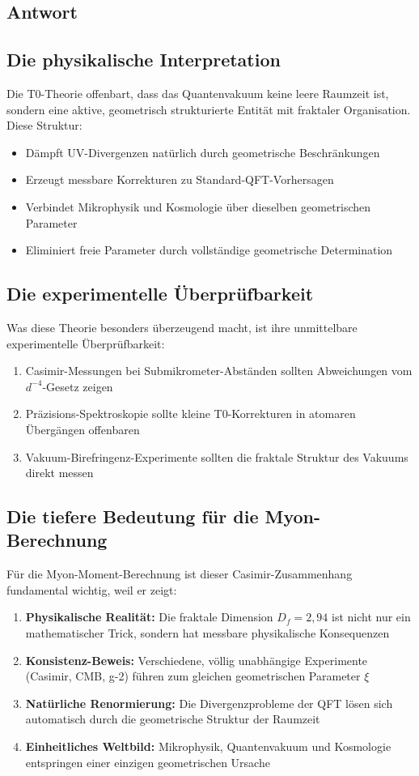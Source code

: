 \documentclass[12pt,a4paper]{article}
\theoremstyle{remark}
\newenvironment{answer}{\subsection*{Antwort}}{\vspace{1em}}
\begin{document}
\begin{answer}
	\subsection{Die physikalische Interpretation}
	
	Die T0-Theorie offenbart, dass das Quantenvakuum keine leere Raumzeit ist, sondern eine aktive, geometrisch strukturierte Entität mit fraktaler Organisation. Diese Struktur:
	\begin{itemize}
		\item Dämpft UV-Divergenzen natürlich durch geometrische Beschränkungen
		\item Erzeugt messbare Korrekturen zu Standard-QFT-Vorhersagen
		\item Verbindet Mikrophysik und Kosmologie über dieselben geometrischen Parameter
		\item Eliminiert freie Parameter durch vollständige geometrische Determination
	\end{itemize}
	
	\subsection{Die experimentelle Überprüfbarkeit}
	
	Was diese Theorie besonders überzeugend macht, ist ihre unmittelbare experimentelle Überprüfbarkeit:
	\begin{enumerate}
		\item Casimir-Messungen bei Submikrometer-Abständen sollten Abweichungen vom $d^{-4}$-Gesetz zeigen
		\item Präzisions-Spektroskopie sollte kleine T0-Korrekturen in atomaren Übergängen offenbaren
		\item Vakuum-Birefringenz-Experimente sollten die fraktale Struktur des Vakuums direkt messen
	\end{enumerate}
	
	\subsection{Die tiefere Bedeutung für die Myon-Berechnung}
	
	Für die Myon-Moment-Berechnung ist dieser Casimir-Zusammenhang fundamental wichtig, weil er zeigt:
	\begin{enumerate}
		\item \textbf{Physikalische Realität:} Die fraktale Dimension $D_f = 2{,}94$ ist nicht nur ein mathematischer Trick, sondern hat messbare physikalische Konsequenzen
		\item \textbf{Konsistenz-Beweis:} Verschiedene, völlig unabhängige Experimente (Casimir, CMB, g-2) führen zum gleichen geometrischen Parameter $\xi$
		\item \textbf{Natürliche Renormierung:} Die Divergenzprobleme der QFT lösen sich automatisch durch die geometrische Struktur der Raumzeit
		\item \textbf{Einheitliches Weltbild:} Mikrophysik, Quantenvakuum und Kosmologie entspringen einer einzigen geometrischen Ursache
	\end{enumerate}
	

\end{answer}
\end{document}
